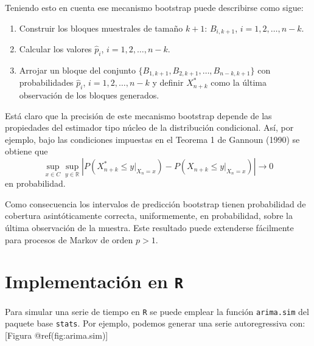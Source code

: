 \documentclass[]{book}
\theoremstyle{definition}
\theoremstyle{definition}
\theoremstyle{definition}
\theoremstyle{remark}
\begin{document}
Teniendo esto en cuenta ese mecanismo bootstrap puede describirse como
sigue:

\begin{enumerate}
\def\labelenumi{\arabic{enumi}.}
\item
  Construir los bloques muestrales de tamaño \(k+1\): \(B_{i,k+1}\),
  \(i=1,2,\ldots ,n-k\).
\item
  Calcular los valores \(\widehat{p}_i\), \(i=1,2,\ldots ,n-k\).
\item
  Arrojar un bloque del conjunto
  \(\{B_{1,k+1},B_{2,k+1},\ldots ,B_{n-k,k+1}\}\) con probabilidades
  \(\widehat{p}_i\), \(i=1,2,\ldots ,n-k\) y definir \(X_{n+k}^{\ast}\)
  como la última observación de los bloques generados.
\end{enumerate}

Está claro que la precisión de este mecanismo bootstrap depende de las
propiedades del estimador tipo núcleo de la distribución condicional.
Así, por ejemplo, bajo las condiciones impuestas en el Teorema 1 de
Gannoun (1990) se obtiene que
\[\sup_{x\in C}\sup_{y\in \mathbb{R}}\left\vert P\left( X_{n+k}^{\ast}\leq
y|_{X_n=x} \right) -P\left( X_{n+k}\leq y|_{X_n=x} \right) \right\vert
\rightarrow 0\] en probabilidad.

Como consecuencia los intervalos de predicción bootstrap tienen
probabilidad de cobertura asintóticamente correcta, uniformemente, en
probabilidad, sobre la última observación de la muestra. Este resultado
puede extenderse fácilmente para procesos de Markov de orden \(p>1\).

\section{\texorpdfstring{Implementación en
\texttt{R}}{Implementación en R}}\label{implementacion-en-r}

Para simular una serie de tiempo en \texttt{R} se puede emplear la
función \texttt{arima.sim} del paquete base \texttt{stats}. Por ejemplo,
podemos generar una serie autoregressiva con: {[}Figura
@ref(fig:arima.sim){]}
\end{document}
